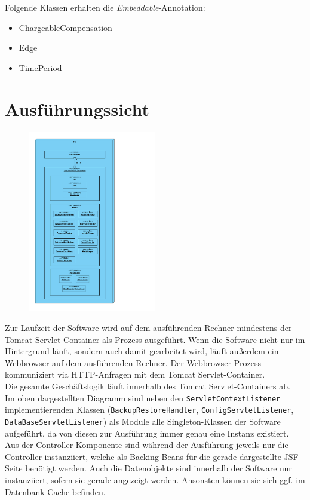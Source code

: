 \documentclass[fontsize=12pt,paper=a4,twoside]{scrartcl}
\begin{document}
Folgende Klassen erhalten die \textit{Embeddable}-Annotation:
\begin{itemize}
\item ChargeableCompensation
\item Edge
\item TimePeriod
\end{itemize}

\clearpage


\section{Ausführungssicht}
\label{sec:ausfuehrung}

\begin{figure}[H]
\centering
\includegraphics[width=0.5\textwidth]{ausfuehrung.pdf}
\end{figure}
Zur Laufzeit der Software wird auf dem ausführenden Rechner mindestens der Tomcat Servlet-Container als Prozess ausgeführt. Wenn die Software nicht nur im Hintergrund läuft, sondern auch damit gearbeitet wird, läuft außerdem ein Webbrowser auf dem ausführenden Rechner. Der Webbrowser-Prozess kommuniziert via HTTP-Anfragen mit dem Tomcat Servlet-Container.\\
Die gesamte Geschäftslogik läuft innerhalb des Tomcat Servlet-Containers ab. \\
Im oben dargestellten Diagramm sind neben den \texttt{ServletContextListener} implementierenden Klassen (\texttt{BackupRestoreHandler}, \texttt{ConfigServletListener}, \texttt{DataBaseServletListener}) als Module alle Singleton-Klassen der Software aufgeführt, da von diesen zur Ausführung immer genau eine Instanz existiert. \\
Aus der Controller-Komponente sind während der Ausführung jeweils nur die Controller instanziiert, welche als Backing Beans für die gerade dargestellte JSF-Seite benötigt werden. Auch die Datenobjekte sind innerhalb der Software nur instanziiert, sofern sie gerade angezeigt werden. Ansonsten können sie sich ggf. im Datenbank-Cache befinden.
\end{document}
